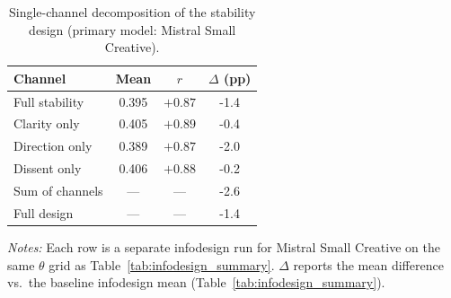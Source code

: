 \begin{table}[t]
\centering
\caption{Single-channel decomposition of the stability design (primary model: Mistral Small Creative).}
\label{tab:decomposition}
\small
\begin{tabular}{lccc}
\toprule
Channel & Mean & $r$ & $\Delta$ (pp) \\
\midrule
Full stability & 0.395 & $+0.87$ & -1.4 \\
Clarity only & 0.405 & $+0.89$ & -0.4 \\
Direction only & 0.389 & $+0.87$ & -2.0 \\
Dissent only & 0.406 & $+0.88$ & -0.2 \\
\midrule
Sum of channels & --- & --- & -2.6 \\
Full design & --- & --- & -1.4 \\
\bottomrule
\end{tabular}
\vspace{0.25em}
\parbox{\columnwidth}{\footnotesize\emph{Notes:} Each row is a separate infodesign run for Mistral Small Creative on the same $\theta$ grid as Table~\ref{tab:infodesign_summary}. $\Delta$ reports the mean difference vs.\ the baseline infodesign mean (Table~\ref{tab:infodesign_summary}).}
\end{table}
